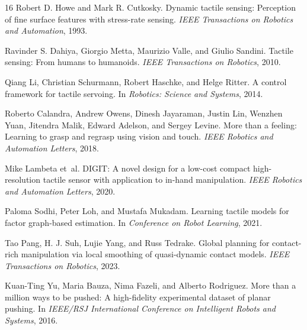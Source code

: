 \documentclass{article}
\begin{document}
\begin{thebibliography}{16}
Robert D. Howe and Mark R. Cutkosky.
\newblock Dynamic tactile sensing: Perception of fine surface features with stress-rate sensing.
\newblock \emph{IEEE Transactions on Robotics and Automation}, 1993.

Ravinder S. Dahiya, Giorgio Metta, Maurizio Valle, and Giulio Sandini.
\newblock Tactile sensing: From humans to humanoids.
\newblock \emph{IEEE Transactions on Robotics}, 2010.

Qiang Li, Christian Schurmann, Robert Haschke, and Helge Ritter.
\newblock A control framework for tactile servoing.
\newblock In \emph{Robotics: Science and Systems}, 2014.

Roberto Calandra, Andrew Owens, Dinesh Jayaraman, Justin Lin, Wenzhen Yuan, Jitendra Malik, Edward Adelson, and Sergey Levine.
\newblock More than a feeling: Learning to grasp and regrasp using vision and touch.
\newblock \emph{IEEE Robotics and Automation Letters}, 2018.

Mike Lambeta et~al.
\newblock DIGIT: A novel design for a low-cost compact high-resolution tactile sensor with application to in-hand manipulation.
\newblock \emph{IEEE Robotics and Automation Letters}, 2020.

Paloma Sodhi, Peter Loh, and Mustafa Mukadam.
\newblock Learning tactile models for factor graph-based estimation.
\newblock In \emph{Conference on Robot Learning}, 2021.

Tao Pang, H. J. Suh, Lujie Yang, and Russ Tedrake.
\newblock Global planning for contact-rich manipulation via local smoothing of quasi-dynamic contact models.
\newblock \emph{IEEE Transactions on Robotics}, 2023.

Kuan-Ting Yu, Maria Bauza, Nima Fazeli, and Alberto Rodriguez.
\newblock More than a million ways to be pushed: A high-fidelity experimental dataset of planar pushing.
\newblock In \emph{IEEE/RSJ International Conference on Intelligent Robots and Systems}, 2016.


\end{thebibliography}
\end{document}
